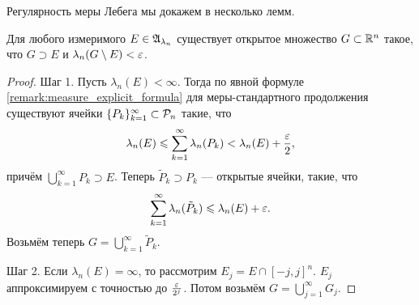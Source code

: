 Регулярность меры Лебега мы докажем в несколько лемм.

\begin{lm}
 \label{lemma:lebesgue_measure_open_sets_above}
 Для любого измеримого $E \in \mathfrak{A}_{\lambda_n}$ существует открытое множество $G \subset \mathbb{R}^{n}$ такое, что $G \supset E$ и $\lambda_n(G \setminus E) < \varepsilon$.
\end{lm}
\begin{proof}
 Шаг 1. Пусть $\lambda_n(E) < \infty$. Тогда по явной формуле \ref{remark:measure_explicit_formula} для меры-стандартного продолжения существуют ячейки $\{P_{k}\}_{k=1}^{\infty} \subset \mathcal{P}_n$  такие, что \begin{align*}
 \lambda_n(E) \leqslant \sum_{k=1}^{\infty} \lambda_n(P_k) < \lambda_n(E) + \frac{\varepsilon}{2}
 ,\end{align*} причём $\bigcup_{k=1}^{\infty} P_k \supset E$. Теперь $\tilde P_k \supset P_k$  --- открытые ячейки, такие, что \begin{align*}
 \sum_{k=1}^{\infty} \lambda_n(\tilde P_k) \leqslant \lambda_n(E) + \varepsilon
.\end{align*}  Возьмём теперь $G = \bigcup_{k=1}^{\infty} \tilde P_k$.

Шаг 2. Если $\lambda_n(E) = \infty$, то рассмотрим $E_j = E \cap [-j, j]^{n}$. $E_j$  аппроксимируем с точностью до $\frac{\varepsilon}{2^{j}}$. Потом возьмём $G = \bigcup_{j=1}^{\infty} G_j$.
\end{proof}

